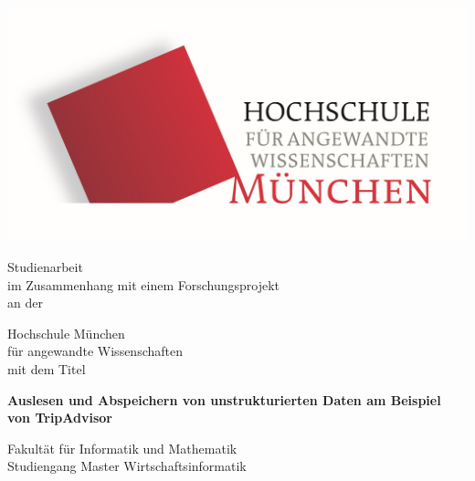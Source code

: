 \thispagestyle{empty}
\begin{center}
	\includegraphics[scale=0.5]{Bilder/HM1_logo.png}


	
	\vspace{1.5cm}
	\huge{Studienarbeit}\\\vspace{1.5cm}
	\large{im Zusammenhang mit einem Forschungsprojekt}\\\vspace{0.5cm}
	\large{an der}\\\vspace{0.5cm}
	
	\huge{Hochschule München}\\
	\normalsize {für angewandte Wissenschaften}\\\vspace{0.5cm}
	\large{mit dem Titel}\\\vspace{1cm}
    \begin{center}
		\Huge{\textbf{Auslesen und Abspeichern von unstrukturierten Daten am Beispiel von TripAdvisor}}\\[2.0cm]
    \end{center}
    
	
	
	\large{Fakultät für Informatik und Mathematik}\\
	\normalsize {Studiengang Master Wirtschaftsinformatik}\\\vspace{2.1cm}
	
\end{center}

